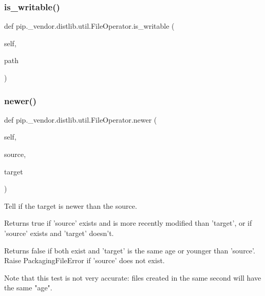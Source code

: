 \subsubsection{\texorpdfstring{is\+\_\+writable()}{is\_writable()}}
{\footnotesize\ttfamily def pip.\+\_\+vendor.\+distlib.\+util.\+File\+Operator.\+is\+\_\+writable (\begin{DoxyParamCaption}\item[{}]{self,  }\item[{}]{path }\end{DoxyParamCaption})}

\mbox{\label{classpip_1_1__vendor_1_1distlib_1_1util_1_1FileOperator_ac18845caf1450573b6a89cda6982db17}} 
\subsubsection{\texorpdfstring{newer()}{newer()}}
{\footnotesize\ttfamily def pip.\+\_\+vendor.\+distlib.\+util.\+File\+Operator.\+newer (\begin{DoxyParamCaption}\item[{}]{self,  }\item[{}]{source,  }\item[{}]{target }\end{DoxyParamCaption})}

\begin{DoxyVerb}Tell if the target is newer than the source.

Returns true if 'source' exists and is more recently modified than
'target', or if 'source' exists and 'target' doesn't.

Returns false if both exist and 'target' is the same age or younger
than 'source'. Raise PackagingFileError if 'source' does not exist.

Note that this test is not very accurate: files created in the same
second will have the same "age".
\end{DoxyVerb}
 \mbox{\label{classpip_1_1__vendor_1_1distlib_1_1util_1_1FileOperator_a90b884b39270a7e8f4dd5194ad2c103c}} 
